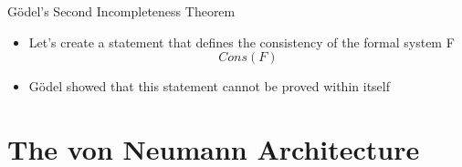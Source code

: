 \documentclass[utf8]{beamer}
\begin{document}
\begin{frame}{G{\"o}del's Second Incompleteness Theorem}
\begin{itemize}
\item Let's create a statement that defines the consistency of the formal system F
\[ Cons(F) \]
\item G{\"o}del showed that this statement cannot be proved within itself
\end{itemize}
\end{frame}

\part{The von Neumann Architecture}
\begin{frame}
\partpage
\end{frame}
\end{document}
